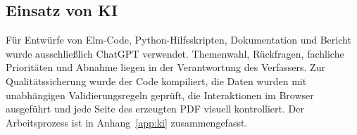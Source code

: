 \subsection*{Einsatz von KI}

Für Entwürfe von Elm-Code, Python-Hilfsskripten, Dokumentation und Bericht wurde
ausschlie{\ss}lich ChatGPT verwendet. Themenwahl, Rückfragen, fachliche
Prioritäten und Abnahme liegen in der Verantwortung des Verfassers. Zur
Qualitätssicherung wurde der Code kompiliert, die Daten wurden mit unabhängigen
Validierungsregeln geprüft, die Interaktionen im Browser ausgeführt und jede
Seite des erzeugten PDF visuell kontrolliert. Der Arbeitsprozess ist in
Anhang~\ref{app:ki} zusammengefasst.
